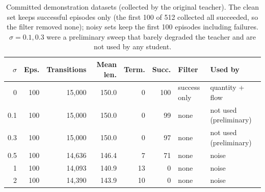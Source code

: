 \begin{table}[t]
\centering
\scriptsize
%
\begin{tabular}{rrrrrrll}
\toprule
$\sigma$ & Eps. & Transitions & Mean len. & Term. & Succ. & Filter & Used by \\
\midrule
0 & 100 & 15,000 & 150.0 & 0 & 100 & success only & quantity + flow \\
0.1 & 100 & 15,000 & 150.0 & 0 & 99 & none & not used (preliminary) \\
0.3 & 100 & 15,000 & 150.0 & 0 & 97 & none & not used (preliminary) \\
0.5 & 100 & 14,636 & 146.4 & 7 & 71 & none & noise \\
1 & 100 & 14,093 & 140.9 & 13 & 0 & none & noise \\
2 & 100 & 14,390 & 143.9 & 10 & 0 & none & noise \\
\bottomrule
\end{tabular}
%
\caption{Committed demonstration datasets (collected by the original teacher). The clean set keeps successful episodes only (the first 100 of 512 collected all succeeded, so the filter removed none); noisy sets keep the first 100 episodes including failures. $\sigma{=}0.1, 0.3$ were a preliminary sweep that barely degraded the teacher and are not used by any student.}
\label{tab:data}
\end{table}
